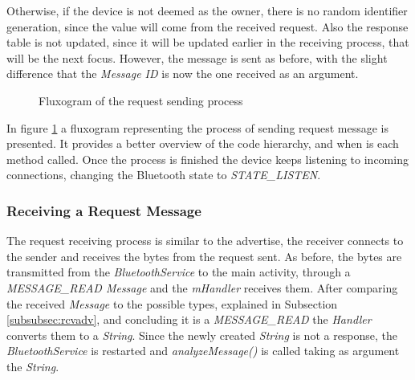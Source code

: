Otherwise, if the device is not deemed as the owner, there is no random identifier generation, since the value will come from the received request. Also the response table is not updated, since it will be updated earlier in the receiving process, that will be the next focus. However, the message is sent as before, with the slight difference that the \textit{Message ID} is now the one received as an argument.

\begin{figure}[ht]
   \noindent{}
	\caption{\label{fig:rqtflux} Fluxogram of the request sending process}
\end{figure}

In figure \ref{fig:rqtflux} a fluxogram representing the process of sending request message is presented. It provides a better overview of the code hierarchy, and when is each method called. Once the process is finished the device keeps listening to incoming connections, changing the Bluetooth state to \textit{STATE\_LISTEN}.

\subsubsection{Receiving a Request Message}
\label{subsubsec:rcvrqt}

The request receiving process is similar to the advertise, the receiver connects to the sender and receives the bytes from the request sent. As before, the bytes are transmitted from the \textit{BluetoothService} to the main activity, through a \textit{MESSAGE\_READ Message} and the \textit{mHandler} receives them. After comparing the received \textit{Message} to the possible types, explained in Subsection \ref{subsubsec:rcvadv}, and concluding it is a \textit{MESSAGE\_READ} the \textit{Handler} converts them to a \textit{String}. Since the newly created \textit{String} is not a response, the \textit{BluetoothService} is restarted and \textit{analyzeMessage()} is called taking as argument the \textit{String}.

